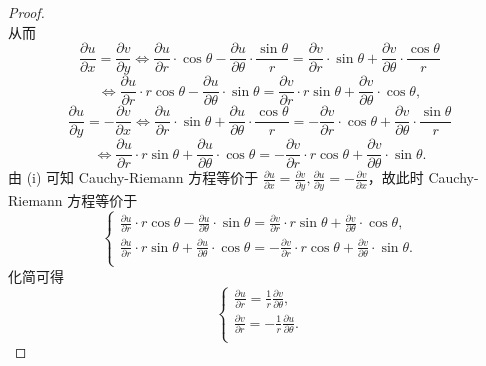 \documentclass[../../main.tex]{subfiles}
\begin{document}
\begin{proof}
\[\]
从而
\[
\frac{\partial u}{\partial x} = \frac{\partial v}{\partial y} \Longleftrightarrow \frac{\partial u}{\partial r} \cdot \cos\theta - \frac{\partial u}{\partial \theta} \cdot \frac{\sin\theta}{r} = \frac{\partial v}{\partial r} \cdot \sin\theta + \frac{\partial v}{\partial \theta} \cdot \frac{\cos\theta}{r}
\]
\[
\Longleftrightarrow \frac{\partial u}{\partial r} \cdot r\cos\theta - \frac{\partial u}{\partial \theta} \cdot \sin\theta = \frac{\partial v}{\partial r} \cdot r\sin\theta + \frac{\partial v}{\partial \theta} \cdot \cos\theta,
\]
\[
\frac{\partial u}{\partial y} = -\frac{\partial v}{\partial x} \Longleftrightarrow \frac{\partial u}{\partial r} \cdot \sin\theta + \frac{\partial u}{\partial \theta} \cdot \frac{\cos\theta}{r} = -\frac{\partial v}{\partial r} \cdot \cos\theta + \frac{\partial v}{\partial \theta} \cdot \frac{\sin\theta}{r}
\]
\[
\Longleftrightarrow \frac{\partial u}{\partial r} \cdot r\sin\theta + \frac{\partial u}{\partial \theta} \cdot \cos\theta = -\frac{\partial v}{\partial r} \cdot r\cos\theta + \frac{\partial v}{\partial \theta} \cdot \sin\theta.
\]
由 (i) 可知 Cauchy-Riemann 方程等价于 \( \frac{\partial u}{\partial x} = \frac{\partial v}{\partial y}, \frac{\partial u}{\partial y} = -\frac{\partial v}{\partial x} \)，故此时 Cauchy-Riemann 方程等价于
\[
\begin{cases}
\frac{\partial u}{\partial r} \cdot r\cos\theta - \frac{\partial u}{\partial \theta} \cdot \sin\theta = \frac{\partial v}{\partial r} \cdot r\sin\theta + \frac{\partial v}{\partial \theta} \cdot \cos\theta, \\
\frac{\partial u}{\partial r} \cdot r\sin\theta + \frac{\partial u}{\partial \theta} \cdot \cos\theta = -\frac{\partial v}{\partial r} \cdot r\cos\theta + \frac{\partial v}{\partial \theta} \cdot \sin\theta. \\
\end{cases}
\]
化简可得
\[
\begin{cases}
\frac{\partial u}{\partial r} = \frac{1}{r}\frac{\partial v}{\partial \theta}, \\
\frac{\partial v}{\partial r} = -\frac{1}{r}\frac{\partial u}{\partial \theta}. \\
\end{cases}
\]
\end{proof}
\end{document}
